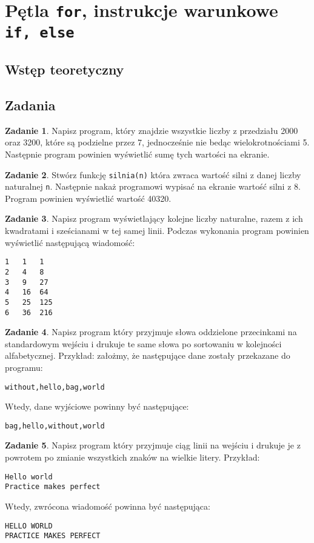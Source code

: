 \documentclass[11pt]{article}
\theoremstyle{definition}
\newtheorem{zadanie}{Zadanie}
\begin{document}
\section{Pętla \texttt{for}, instrukcje warunkowe \texttt{if, else}}
\subsection{Wstęp teoretyczny}
\subsection{Zadania}

\begin{zadanie}
Napisz program, który znajdzie wszystkie liczby z przedziału 2000 oraz 3200, które są podzielne przez 7, jednocześnie nie bedąc wielokrotnościami 5. Następnie program powinien wyświetlić sumę tych wartości na ekranie.
\end{zadanie}

\begin{zadanie}
Stwórz funkcję \texttt{silnia(n)} która zwraca wartość silni z danej liczby naturalnej \texttt{n}. Następnie nakaż programowi wypisać na ekranie wartość silni z 8. Program powinien wyświetlić wartość 40320.
\end{zadanie}

\begin{zadanie}
Napisz program wyświetlający kolejne liczby naturalne, razem z ich kwadratami i sześcianami w tej samej linii. Podczas wykonania program powinien wyświetlić następującą wiadomość:
\begin{verbatim}
1	1	1
2	4	8
3	9	27
4	16	64
5	25	125
6	36	216
\end{verbatim}
\end{zadanie}


\begin{zadanie}
Napisz program który przyjmuje słowa oddzielone przecinkami na standardowym wejściu i drukuje te same słowa po sortowaniu w kolejności alfabetycznej.
Przykład: założmy, że następujące dane zostały przekazane do programu:
\begin{verbatim}
without,hello,bag,world
\end{verbatim}
Wtedy, dane wyjściowe powinny być następujące:
\begin{verbatim}
bag,hello,without,world
\end{verbatim}
\end{zadanie}


\begin{zadanie}
Napisz program który przyjmuje ciąg linii na wejściu i drukuje je z powrotem po zmianie wszystkich znaków na wielkie litery.
Przykład: 
\begin{verbatim}
Hello world
Practice makes perfect
\end{verbatim}
Wtedy, zwrócona wiadomość powinna być następująca:
\begin{verbatim}
HELLO WORLD
PRACTICE MAKES PERFECT
\end{verbatim}
\end{zadanie}
\end{document}
